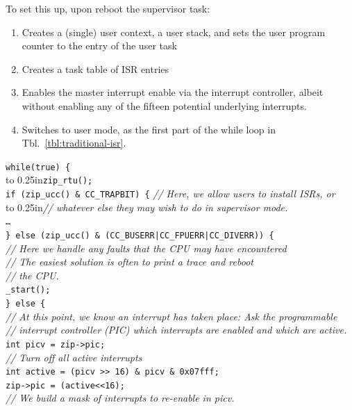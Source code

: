 \documentclass{gqtekspec}
\begin{document}
To set this up, upon reboot the supervisor task:
\begin{enumerate}
\item Creates a (single) user context, a user stack, and sets the user
	program counter to the entry of the user task
\item Creates a task table of ISR entries
\item Enables the master interrupt enable via the interrupt controller, albeit
	without enabling any of the fifteen potential underlying interrupts.
\item Switches to user mode, as the first part of the while loop in 
	Tbl.~\ref{tbl:traditional-isr}.
\end{enumerate}
\begin{table}\begin{center}
\begin{tabbing}
{\tt while(true) \{} \\
\hbox to 0.25in{}\= {\tt zip\_rtu();}\\
	\> {\tt if (zip\_ucc() \& CC\_TRAPBIT) \{} {\em // Here, we allow users to install ISRs, or} \\
	\>\hbox to 0.25in{}\= {\em // whatever else they may wish to do in supervisor mode.} \\
	\>\> {\tt \ldots} \\
	\> {\tt \} else (zip\_ucc() \& (CC\_BUSERR|CC\_FPUERR|CC\_DIVERR)) \{}\\
	\>\> {\em // Here we handle any faults that the CPU may have
		encountered }\\
	\>\> {\em // The easiest solution is often to print a trace and reboot}\\
	\>\> {\em // the CPU.}\\
	\>\> {\tt \_start();} \\
	\> {\tt \} else \{} \\
	\> \> {\em // At this point, we know an interrupt has taken place:  Ask the programmable}\\
	\> \> {\em // interrupt controller (PIC) which interrupts are enabled and which are active.}\\
	\> \>	{\tt int	picv = zip->pic;}\\
	\> \>	{\em // Turn off all active interrupts}\\
	\> \>	{\tt int	active = (picv >> 16) \& picv \& 0x07fff;}\\
	\> \>	{\tt zip->pic = (active<<16);}\\
	\> \>	{\em // We build a mask of interrupts to re-enable in picv.}\\

\end{tabbing}
\end{center}
\end{table}
\end{document}
